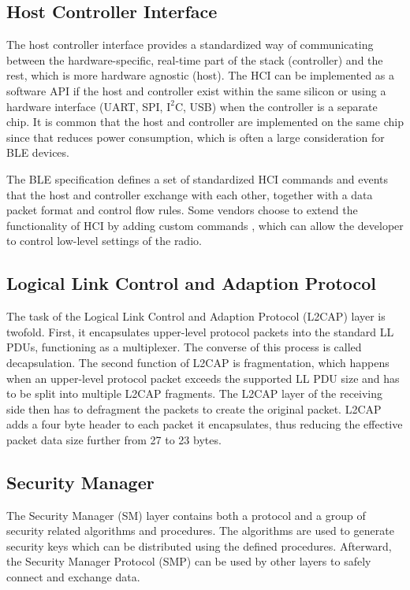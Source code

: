 \subsection{Host Controller Interface}
The host controller interface provides a standardized way of communicating between the hardware-specific, real-time part of the stack (controller) and the rest, which is more hardware agnostic (host). The HCI can be implemented as a software API if the host and controller exist within the same silicon or using a hardware interface (UART, SPI, $\text{I}^{2}\text{C}$, USB) when the controller is a separate chip. It is common that the host and controller are implemented on the same chip since that reduces power consumption, which is often a large consideration for BLE devices.

The BLE specification defines a set of standardized HCI commands and events that the host and controller exchange with each other, together with a data packet format and control flow rules\cite{townsend_cufi}. Some vendors choose to extend the functionality of HCI by adding custom commands \cite{ti_ble_dev_guide}, which can allow the developer to control low-level settings of the radio.

\subsection{Logical Link Control and Adaption Protocol}
The task of the Logical Link Control and Adaption Protocol (L2CAP) layer is twofold. First, it encapsulates upper-level protocol packets into the standard LL PDUs, functioning as a multiplexer. The converse of this process is called decapsulation. The second function of L2CAP is fragmentation, which happens when an upper-level protocol packet exceeds the supported LL PDU size and has to be split into multiple L2CAP fragments. The L2CAP layer of the receiving side then has to defragment the packets to create the original packet. L2CAP adds a four byte header to each packet it encapsulates, thus reducing the effective packet data size further from 27 to 23 bytes.

\subsection{Security Manager}
The Security Manager (SM) layer contains both a protocol and a group of security related algorithms and procedures. The algorithms are used to generate security keys which can be distributed using the defined procedures. Afterward, the Security Manager Protocol (SMP) can be used by other layers to safely connect and exchange data.

